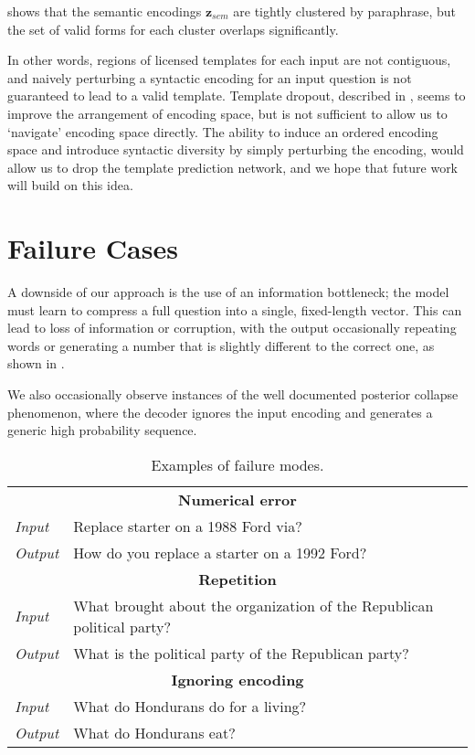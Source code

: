 \documentclass[11pt,a4paper]{article}
\begin{document}
 shows that the semantic encodings $\textbf{z}_{sem}$ are tightly clustered by paraphrase, but the set of valid forms for each cluster overlaps significantly.  

In other words, regions of licensed templates for each input are not contiguous, and naively perturbing a syntactic encoding for an input question is not guaranteed to lead to a valid template. Template dropout, described in , seems to improve the arrangement of encoding space, but is not sufficient to allow us to `navigate' encoding space directly. The ability to induce an ordered encoding space and introduce syntactic diversity by simply perturbing the encoding, would allow us to drop the template prediction network, and we hope that future work will build on this idea.

\section{Failure Cases}
\label{sec:failure}

A downside of our approach is the use of an information bottleneck; the model must learn to compress a full question into a single, fixed-length vector. This can lead to loss of information or corruption, with the output occasionally repeating words or generating a number that is slightly different to the correct one, as shown in .



We also occasionally observe instances of the well documented posterior collapse phenomenon, where the decoder ignores the input encoding and generates a generic high probability sequence.


\begin{table}[t!]
    \small
    \centering
    \begin{tabular}{lp{6cm}} \hline \hline
\multicolumn{2}{c}{\textbf{Numerical error}} \\
\emph{Input} & Replace starter on a 1988 Ford via? \\
\emph{Output} & How do you replace a starter on a 1992 Ford? \\
        \hline\hline
 \multicolumn{2}{c}{\textbf{Repetition}} \\
 \emph{Input} & What brought about the organization of the Republican
 political party? \\
\emph{Output} & What is the political party of the Republican party? \\
        \hline\hline
 \multicolumn{2}{c}{\textbf{Ignoring encoding}} \\
\emph{Input}& What do Hondurans do for a living?\\
\emph{Output}& What do Hondurans eat?\\ \hline \hline
    \end{tabular}
    \caption{Examples of failure modes.}
    \label{tab:errors}
\end{table}
\end{document}
